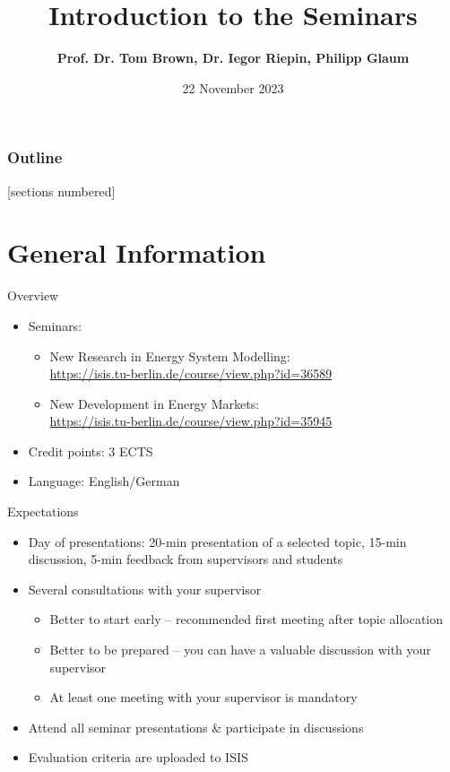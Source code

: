 \documentclass[10pt,aspectratio=169,dvipsnames]{beamer}
\title{Introduction to the Seminars}
\author{\bf Prof. Dr. Tom Brown, Dr. Iegor Riepin, Philipp Glaum}
\institute[Technische Universität Berlin] %
{
  \normalsize
  Technische Universität Berlin\\
  Department of Digital Transformation in Energy Systems \\
  Institute of Energy Technology
}
\date{22 November 2023}
\begin{document}
{
\maketitle
}
\addtocounter{framenumber}{-1}

\begin{frame}
  \frametitle{Outline}
  [sections numbered]
  \tableofcontents[hideallsubsections]
\end{frame}


\section{General Information}

\begin{frame}{Overview}

  \begin{itemize}
    \item Seminars:
          \begin{itemize}
            \item New Research in Energy System Modelling:
                  \\ \href{https://isis.tu-berlin.de/course/view.php?id=36589}{https://isis.tu-berlin.de/course/view.php?id=36589}
            \item New Development in Energy Markets:\\ \href{https://isis.tu-berlin.de/course/view.php?id=35945}{https://isis.tu-berlin.de/course/view.php?id=35945}
          \end{itemize}
    \item Credit points: 3 ECTS
    \item Language: English/German
  \end{itemize}

\end{frame}

\begin{frame}{Expectations}

  \begin{itemize}
    \item Day of presentations: 20-min presentation of a selected topic, 15-min discussion, 5-min feedback from supervisors and students
    \item Several consultations with your supervisor
    \begin{itemize}
        \item Better to start early -- recommended first meeting after topic allocation
        \item Better to be prepared -- you can have a valuable discussion with your supervisor
        \item At least one meeting with your supervisor is mandatory
    \end{itemize}
    \item Attend all seminar presentations \&  participate in discussions
    \item Evaluation criteria are uploaded to ISIS
  \end{itemize}

\end{frame}
\end{document}
